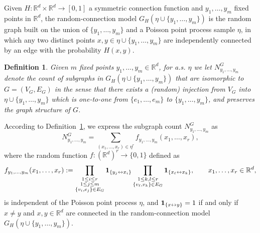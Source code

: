 \documentclass[12pt]{article}
\newcommand{\R}{\mathbb{R}}
\newcommand{\bone}{{\bf 1}}
\newtheorem{definition}[prop]{Definition}
\def\real{{\mathord{\mathbb R}}}
\numberwithin{equation}{section}
\begin{document}
\noindent
 Given $H:\R^d\times \R^d\to[0,1]$ 
 a symmetric connection function and  
 $y_1 , \ldots,y_m$ fixed points in $\R^d$,
 the random-connection model 
  $G_H (\eta \cup \{y_1, \ldots ,y_m\})$
 is the random graph built on the union of $\{y_1 , \ldots,y_m \}$
 and a Poisson point process
 sample $\eta$, 
  in which any two distinct points 
  $x,y\in \eta \cup \{y_1, \ldots ,y_m\}$
  are independently connected by an edge with the probability $H(x,y)$.  
\begin{definition}
\label{fjkl} 
  Given $m$ fixed points $y_1 , \ldots,y_m \in \R^d$,
  for a.s. $\eta$ we let $N_{y_1,\ldots , y_m}^G$ denote the count of subgraphs
 in $G_H (\eta \cup \{y_1,\ldots , y_m \} )$
 that are isomorphic to $G=(V_G,E_G)$ in the sense that 
 there exists a (random) injection
 from $V_G$ into $\eta \cup \{y_1,\ldots , y_m \}$
 which is one-to-one from $\{e_1,\ldots , e_m\}$ to $\{y_1,\ldots , y_m\}$, 
 and preserves the graph structure of $G$. 
\end{definition}
\noindent
According to Definition~\ref{fjkl}, we express the subgraph count
 $N^G_{y_1,\ldots , y_m}$ as  
\begin{equation}
\nonumber
  N_{y_1,\ldots , y_m}^G=\sum_{(x_1, \ldots ,x_r)\in\eta^{r}}f_{y_1,\ldots , y_m} (x_1, \ldots ,x_r), 
\end{equation}
where the random
function $f:(\real^d)^r \to \{0,1\}$ defined as 
\begin{equation}
\nonumber
f_{y_1,\ldots , y_m} (x_1, \ldots ,x_r):=
\prod_{
  \substack{
    1 \leq i \leq r
    \\
    1 \leq j \leq m
    \\ \{v_i,e_j\}\in E_G }
}
\bone_{\{y_j\leftrightarrow x_i\}} 
\prod_{\substack{ 1 \leq k,l \leq r
    \\ \{v_\ell,v_k\}\in E_G}}\bone_{\{x_\ell\leftrightarrow x_k\}},
\qquad
 x_1,\ldots , x_r \in \R^d, 
\end{equation}
is independent of the Poisson point process $\eta$,
 and $\bone_{\{x\leftrightarrow y\}}=1$ if and only if
$x\neq y$ and $x,y\in \real^d$ are connected in the
 random-connection model 
 $G_H (\eta \cup \{y_1, \ldots ,y_m\})$.
\end{document}

